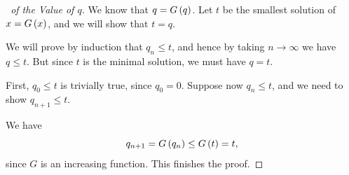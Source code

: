 \documentclass{article}
\theoremstyle{definition}
\theoremstyle{remark}
\begin{document}
\begin{proof}[\proofname\ of the Value of \(q\)]
    We know that \(q = G\left(q\right)\). Let \(t\) be the smallest solution of \(x = G\left(x\right)\), and we will show that \(t = q\).

    We will prove by induction that \(q_n \leq t\), and hence by taking \(n \to \infty\) we have \(q \leq t\). But since \(t\) is the minimal solution, we must have \(q = t\).

    First, \(q_0 \leq t\) is trivially true, since \(q_0 = 0\). Suppose now \(q_n \leq t\), and we need to show \(q_{n + 1} \leq t\).

    We have
    \[
        q_{n + 1} = G\left(q_n\right) \leq G\left(t\right) = t,
    \]
    since \(G\) is an increasing function. This finishes the proof.
\end{proof}
\end{document}
